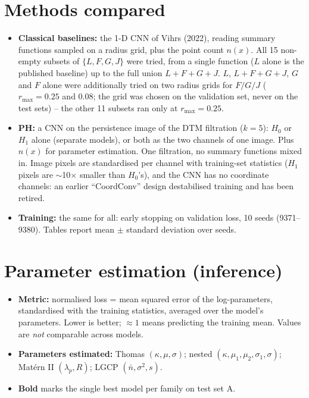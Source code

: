 \documentclass[10pt,a4paper]{article}
\newcommand{\nbar}{\bar n}
\begin{document}
\section{Methods compared}

\begin{itemize}
  \item \textbf{Classical baselines:} the 1-D CNN of Vihrs (2022), reading summary functions sampled on a radius grid, plus the point count $n(x)$. All 15 non-empty subsets of $\{L,F,G,J\}$ were tried, from a single function ($L$ alone is the published baseline) up to the full union $L{+}F{+}G{+}J$. $L$, $L{+}F{+}G{+}J$, $G$ and $F$ alone were additionally tried on two radius grids for $F/G/J$ ($r_{\max}=0.25$ and $0.08$; the grid was chosen on the validation set, never on the test sets) -- the other 11 subsets ran only at $r_{\max}=0.25$.
  \item \textbf{PH:} a CNN on the persistence image of the DTM filtration ($k=5$): $H_0$ or $H_1$ alone (separate models), or both as the two channels of one image. Plus $n(x)$ for parameter estimation. One filtration, no summary functions mixed in. Image pixels are standardised per channel with training-set statistics ($H_1$ pixels are $\sim$10$\times$ smaller than $H_0$'s), and the CNN has no coordinate channels: an earlier ``CoordConv'' design destabilised training and has been retired.
  \item \textbf{Training:} the same for all: early stopping on validation loss, 10 seeds (9371--9380). Tables report mean $\pm$ standard deviation over seeds.
\end{itemize}

\section{Parameter estimation (inference)}

\begin{itemize}
  \item \textbf{Metric:} normalised loss = mean squared error of the log-parameters, standardised with the training statistics, averaged over the model's parameters. Lower is better; $\approx 1$ means predicting the training mean. Values are \emph{not} comparable across models.
  \item \textbf{Parameters estimated:} Thomas $(\kappa,\mu,\sigma)$; nested $(\kappa,\mu_1,\mu_2,\sigma_1,\sigma)$; Mat\'ern II $(\lambda_p,R)$; LGCP $(\nbar,\sigma^2,s)$.
  \item \textbf{Bold} marks the single best model per family on test set A.
\end{itemize}
\end{document}
